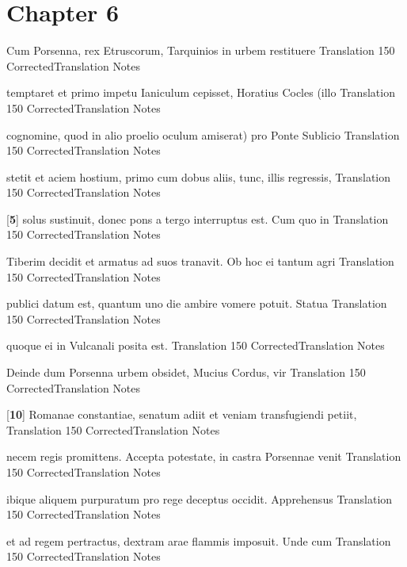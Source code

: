\chapter*{Chapter 6} %
\label{sec:chapter_6}

\latline
  {Cum Porsenna, rex Etruscorum, Tarquinios in urbem restituere}
  { Translation }
  {150}
  { CorrectedTranslation }
  { Notes }


\latline
  {temptaret et primo impetu Ianiculum cepisset, Horatius Cocles (illo}
  { Translation }
  {150}
  { CorrectedTranslation }
  { Notes }


\latline
  {cognomine, quod in alio proelio oculum amiserat) pro Ponte Sublicio}
  { Translation }
  {150}
  { CorrectedTranslation }
  { Notes }


\latline
  {stetit et aciem hostium, primo cum dobus aliis, tunc, illis regressis,}
  { Translation }
  {150}
  { CorrectedTranslation }
  { Notes }


\latline
  {[\textbf{5}] solus sustinuit, donec pons a tergo interruptus est.  Cum quo in}
  { Translation }
  {150}
  { CorrectedTranslation }
  { Notes }


\latline
  {Tiberim decidit et armatus ad suos tranavit.  Ob hoc ei tantum agri}
  { Translation }
  {150}
  { CorrectedTranslation }
  { Notes }


\latline
  {publici datum est, quantum uno die ambire vomere potuit. Statua}
  { Translation }
  {150}
  { CorrectedTranslation }
  { Notes }


\latline
  {quoque ei in Vulcanali posita est.}
  { Translation }
  {150}
  { CorrectedTranslation }
  { Notes }


\latline
  {Deinde dum Porsenna urbem obsidet, Mucius Cordus, vir}
  { Translation }
  {150}
  { CorrectedTranslation }
  { Notes }


\latline
  {[\textbf{10}] Romanae constantiae, senatum adiit et veniam transfugiendi petiit,}
  { Translation }
  {150}
  { CorrectedTranslation }
  { Notes }


\latline
  {necem regis promittens.  Accepta potestate, in castra Porsennae venit}
  { Translation }
  {150}
  { CorrectedTranslation }
  { Notes }


\latline
  {ibique aliquem purpuratum pro rege deceptus occidit.  Apprehensus}
  { Translation }
  {150}
  { CorrectedTranslation }
  { Notes }


\latline
  {et ad regem pertractus, dextram arae flammis imposuit.  Unde cum }
  { Translation }
  {150}
  { CorrectedTranslation }
  { Notes }



